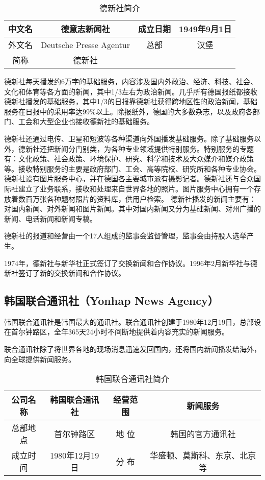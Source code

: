 \documentclass[a4paper,openany]{book}
\begin{document}
\begin{table}[ht]
\centering
\setlength{\belowcaptionskip}{5pt}
\caption{德新社简介}
\begin{tabular}{|c|c|c|c|}
\hline
中文名    & 德意志新闻社                  & 成立日期 & 1949年9月1日 \\ \hline
外文名    & Deutsche Presse Agentur & 总部   & 汉堡        \\ \hline
简称 & 德新社                     &      &           \\ \hline
\end{tabular}
\end{table}

德新社每天播发约6万字的基础服务，内容涉及国内外政治、经济、科技、社会、文化和体育等各方面的新闻，其中1/3左右为政治新闻。几乎所有德国报纸都接收德新社播发的基础服务，其中1/3的日报靠德新社获得跨地区性的政治新闻，基础服务在日报中的采用率达99\%以上。除报纸外，德国的大多数杂志，以及政府各部门、工会和大型企业也接收德新社的基础服务。

德新社还通过电传、卫星和短波等各种渠道向外国播发基础服务。除了基础服务以外，德新社还把新闻分门别类，为各种专业领域提供特别服务。特别服务的专题有：文化政策、社会政策、环境保护、研究、科学和技术及大众媒介和媒介政策等。接收特别服务的主要是政府部门、工会、高等院校、研究所和各种专业协会。德新社设有图片服务中心，并在德国各主要城市派有摄影记者。德新社还与合众国际社建立了业务联系，接收和处理来自世界各地的照片。图片服务中心拥有一个存放着数百万张各种题材照片的资料库，供用户检索。
德新社播发的新闻主要有：对国内新闻、对外新闻和图片新闻。其中对国内新闻又分为基础新闻、对州广播的新闻、电话新闻和新闻专稿。

德新社的报道和经营由一个17人组成的监事会监督管理，监事会由持股人选举产生。

1974年，德新社与新华社正式签订了交换新闻和合作协议。1996年2月新华社与德新社签订了新的交换新闻和合作协议。

\subsection{韩国联合通讯社（Yonhap News Agency）}

韩国联合通讯社是韩国最大的通讯社。联合通讯社创建于1980年12月19日，总部设在首尔钟路区，全年365天24小时不间断地提供着内容充实的新闻服务。

联合通讯社除了将世界各地的现场消息迅速发回国内，还将国内新闻播发给海外，向全球提供新闻服务。

\begin{table}[ht]
\centering
\setlength{\belowcaptionskip}{5pt}
\caption{韩国联合通讯社简介}
\begin{tabular}{|c|c|c|c|}
\hline
公司名称 & 韩国联合通讯社     & 经营范围   & 新闻服务           \\ \hline
总部地点 & 首尔钟路区       & 地    位 & 韩国的官方通讯社       \\ \hline
成立时间 & 1980年12月19日 & 分    布 & 华盛顿、莫斯科、东京、北京等 \\ \hline
\end{tabular}
\end{table}
\end{document}
